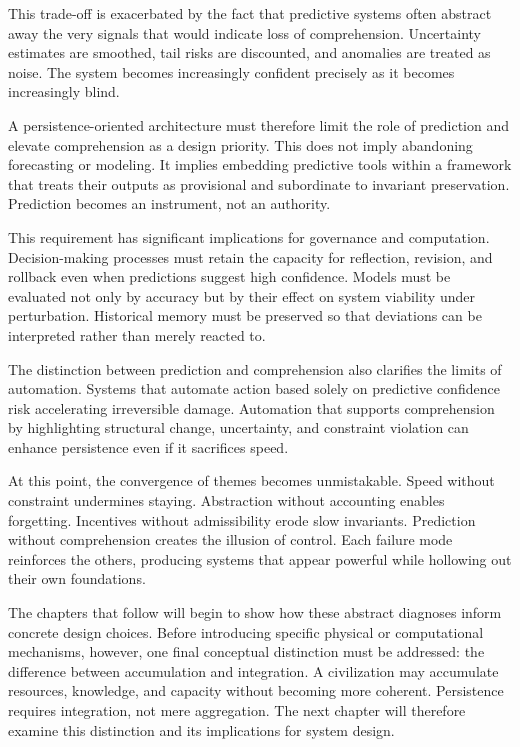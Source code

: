 \documentclass[12pt,oneside]{book}
\begin{document}
This trade-off is exacerbated by the fact that predictive systems often abstract away the very signals that would indicate loss of comprehension. Uncertainty estimates are smoothed, tail risks are discounted, and anomalies are treated as noise. The system becomes increasingly confident precisely as it becomes increasingly blind.

A persistence-oriented architecture must therefore limit the role of prediction and elevate comprehension as a design priority. This does not imply abandoning forecasting or modeling. It implies embedding predictive tools within a framework that treats their outputs as provisional and subordinate to invariant preservation. Prediction becomes an instrument, not an authority.

This requirement has significant implications for governance and computation. Decision-making processes must retain the capacity for reflection, revision, and rollback even when predictions suggest high confidence. Models must be evaluated not only by accuracy but by their effect on system viability under perturbation. Historical memory must be preserved so that deviations can be interpreted rather than merely reacted to.

The distinction between prediction and comprehension also clarifies the limits of automation. Systems that automate action based solely on predictive confidence risk accelerating irreversible damage. Automation that supports comprehension by highlighting structural change, uncertainty, and constraint violation can enhance persistence even if it sacrifices speed.

At this point, the convergence of themes becomes unmistakable. Speed without constraint undermines staying. Abstraction without accounting enables forgetting. Incentives without admissibility erode slow invariants. Prediction without comprehension creates the illusion of control. Each failure mode reinforces the others, producing systems that appear powerful while hollowing out their own foundations.

The chapters that follow will begin to show how these abstract diagnoses inform concrete design choices. Before introducing specific physical or computational mechanisms, however, one final conceptual distinction must be addressed: the difference between accumulation and integration. A civilization may accumulate resources, knowledge, and capacity without becoming more coherent. Persistence requires integration, not mere aggregation. The next chapter will therefore examine this distinction and its implications for system design.
\end{document}
